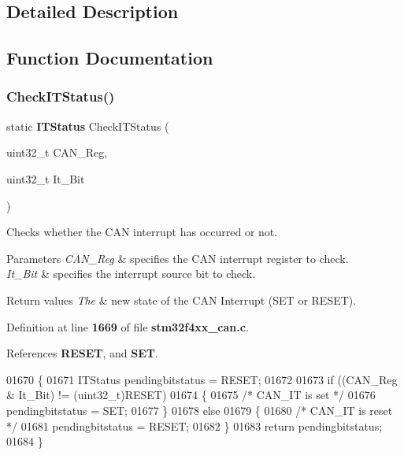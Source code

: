 \subsection{Detailed Description}


\subsection{Function Documentation}
\mbox{\label{group__CAN__Private__Functions_gaed56e0c694fbf4dc2fd3244d4e4e269a}} 
\subsubsection{Check\+I\+T\+Status()}
{\footnotesize\ttfamily static \textbf{ I\+T\+Status} Check\+I\+T\+Status (\begin{DoxyParamCaption}\item[{uint32\+\_\+t}]{C\+A\+N\+\_\+\+Reg,  }\item[{uint32\+\_\+t}]{It\+\_\+\+Bit }\end{DoxyParamCaption})\hspace{0.3cm}{\ttfamily [static]}}



Checks whether the C\+AN interrupt has occurred or not. 


\begin{DoxyParams}{Parameters}
{\em C\+A\+N\+\_\+\+Reg} & specifies the C\+AN interrupt register to check. \\
\hline
{\em It\+\_\+\+Bit} & specifies the interrupt source bit to check. \\
\hline
\end{DoxyParams}

\begin{DoxyRetVals}{Return values}
{\em The} & new state of the C\+AN Interrupt (S\+ET or R\+E\+S\+ET). \\
\hline
\end{DoxyRetVals}


Definition at line \textbf{ 1669} of file \textbf{ stm32f4xx\+\_\+can.\+c}.



References \textbf{ R\+E\+S\+ET}, and \textbf{ S\+ET}.


\begin{DoxyCode}
01670 \{
01671   ITStatus pendingbitstatus = RESET;
01672   
01673   \textcolor{keywordflow}{if} ((CAN\_Reg & It\_Bit) != (uint32\_t)RESET)
01674   \{
01675     \textcolor{comment}{/* CAN\_IT is set */}
01676     pendingbitstatus = SET;
01677   \}
01678   \textcolor{keywordflow}{else}
01679   \{
01680     \textcolor{comment}{/* CAN\_IT is reset */}
01681     pendingbitstatus = RESET;
01682   \}
01683   \textcolor{keywordflow}{return} pendingbitstatus;
01684 \}
\end{DoxyCode}
